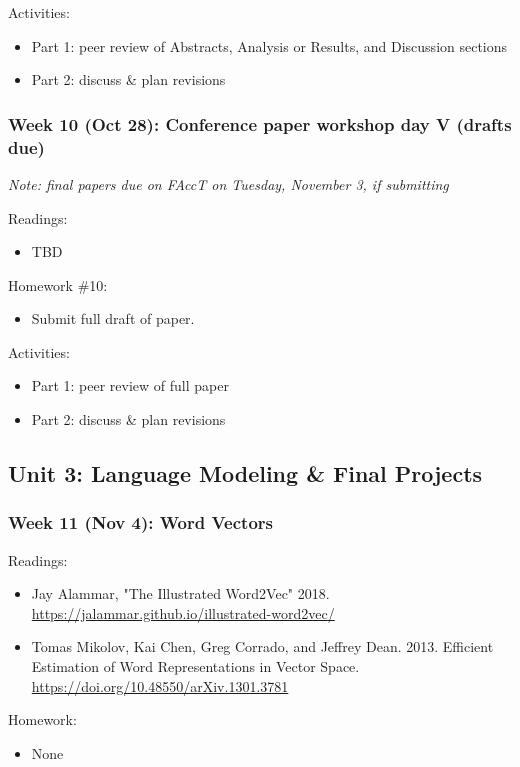 \documentclass[12pt]{article}
\begin{document}
Activities:
\begin{itemize}
\item Part 1: peer review of Abstracts, Analysis or Results, and
Discussion sections
\item Part 2: discuss \& plan revisions
\end{itemize}

\subsubsection*{Week 10 (Oct 28): Conference paper workshop day V (drafts due)}
\label{sec:org67a6842}
\emph{Note: final papers due on FAccT on Tuesday, November 3, if
submitting}

Readings:
\begin{itemize}
\item TBD
\end{itemize}

Homework \#10: 
\begin{itemize}
\item Submit full draft of paper.
\end{itemize}

Activities:
\begin{itemize}
\item Part 1: peer review of full paper
\item Part 2: discuss \& plan revisions
\end{itemize}

\subsection*{Unit 3: Language Modeling \& Final Projects}
\label{sec:orga709ecd}
\subsubsection*{Week 11 (Nov 4): Word Vectors}
\label{sec:org3a33425}
Readings:
\begin{itemize}
\item Jay Alammar, "The Illustrated Word2Vec" 2018.
\url{https://jalammar.github.io/illustrated-word2vec/}
\item Tomas Mikolov, Kai Chen, Greg Corrado, and Jeffrey Dean. 2013.
Efficient Estimation of Word Representations in Vector Space.
\url{https://doi.org/10.48550/arXiv.1301.3781}
\end{itemize}

Homework:
\begin{itemize}
\item None
\end{itemize}
\end{document}
